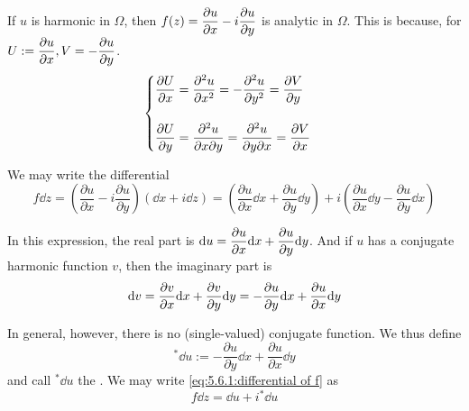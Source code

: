 If  $ u  $ is harmonic in  $ \Omega  $, then  $ f(z)=\displaystyle\frac{\partial u}{\partial x}-i\frac{\partial u}{\partial y} $ is analytic in  $ \Omega $. This is because, for  $ U:=\displaystyle\frac{\partial u}{\partial x}, V=-\frac{\partial u}{\partial y}$.
\begin{equation}
    \begin{cases}
        \displaystyle\frac{\partial U }{\partial x}=\frac{\partial ^2 u}{\partial x^2}=-\frac{\partial ^2 u}{\partial y^2}=\frac{\partial V}{\partial y}\\
        \\
        
        \displaystyle\frac{\partial U}{\partial y}=\frac{\partial ^2 u}{\partial x\partial y}=\frac{\partial ^2 u}{\partial y\partial x}=\frac{\partial V}{\partial x}
    \end{cases}
\end{equation}

We may write the differential 
\begin{equation}
    f \dd z=\left(\frac{\partial u}{\partial x}-i\frac{\partial u}{\partial y}\right)\left(\dd x+i\dd z\right)=\left(\frac{\partial u}{\partial x}\dd x+\frac{\partial u}{\partial y}\dd y \right)+i\left(\frac{\partial u }{\partial x}\dd y-\frac{\partial u }{\partial y }\dd x\right)\label{eq:5.6.1:differential of f}
\end{equation}

In this expression, the real part is  $ \displaystyle\mathrm{d} u=\frac{\partial u }{\partial x}\mathrm{d} x+\frac{\partial u }{\partial y}\mathrm{d} y $.
And if  $ u  $ has a conjugate harmonic function  $ v $, then the imaginary part is  \[\displaystyle \mathrm{d} v=\frac{\partial v }{\partial x}\mathrm{d} x+\frac{\partial v}{\partial y}\mathrm{d} y=-\frac{\partial u}{\partial y}\mathrm{d} x+\frac{\partial u}{\partial x}\mathrm{d} y  \]

In general, however, there is no (single-valued) conjugate function. We thus define 
\begin{equation}
    {}^*\dd u:=-\frac{\partial u}{\partial y}\dd x+\frac{\partial u}{\partial x}\dd y\label{eq:5.6.1:definition of conjugate differential of du}
\end{equation}
and call  $ {}^*\dd u  $ the . We may write \eqref{eq:5.6.1:differential of f} as 
\begin{equation}
    f\dd z=\dd u+i{}^*\dd u\label{eq:5.6.1:simplication of differential of f}
\end{equation}

